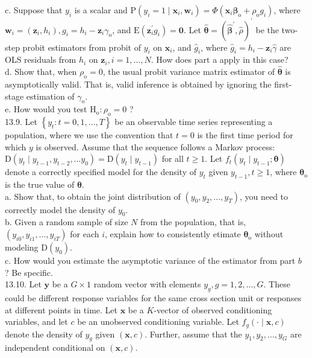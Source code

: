 \documentclass[10pt]{article}
\begin{document}
c. Suppose that $y_{i}$ is a scalar and $\mathrm{P}\left(y_{i}=1 \mid \mathbf{x}_{i}, \mathbf{w}_{i}\right)=\Phi\left(\mathbf{x}_{i} \boldsymbol{\beta}_{\mathrm{o}}+\rho_{\mathrm{o}} g_{i}\right)$, where $\mathbf{w}_{i}= \left(\mathbf{z}_{i}, h_{i}\right), g_{i}=h_{i}-\mathbf{z}_{i} \gamma_{\mathrm{o}}$, and $\mathrm{E}\left(\mathbf{z}_{i}^{\prime} g_{i}\right)=\mathbf{0}$. Let $\hat{\boldsymbol{\theta}}=\left(\hat{\boldsymbol{\beta}}^{\prime}, \hat{\rho}\right)^{\prime}$ be the two-step probit estimators from probit of $y_{i}$ on $\mathbf{x}_{i}$, and $\hat{g}_{i}$, where $\hat{g}_{i}=h_{i}-\mathbf{z}_{i} \hat{\gamma}$ are OLS residuals from $h_{i}$ on $\mathbf{z}_{i}, i=1, \ldots, N$. How does part a apply in this case?\\
d. Show that, when $\rho_{\mathrm{o}}=0$, the usual probit variance matrix estimator of $\hat{\boldsymbol{\theta}}$ is asymptotically valid. That is, valid inference is obtained by ignoring the first-stage estimation of $\gamma_{\mathrm{o}}$.\\
e. How would you test $\mathrm{H}_{\mathrm{o}}: \rho_{\mathrm{o}}=0$ ?\\
13.9. Let $\left\{y_{t}: t=0,1, \ldots, T\right\}$ be an observable time series representing a population, where we use the convention that $t=0$ is the first time period for which $y$ is observed. Assume that the sequence follows a Markov process: $\mathrm{D}\left(y_{t} \mid y_{t-1}, y_{t-2}, \ldots y_{0}\right) =\mathrm{D}\left(y_{t} \mid y_{t-1}\right)$ for all $t \geq 1$. Let $f_{t}\left(y_{t} \mid y_{t-1} ; \boldsymbol{\theta}\right)$ denote a correctly specified model for the density of $y_{t}$ given $y_{t-1}, t \geq 1$, where $\boldsymbol{\theta}_{\mathrm{o}}$ is the true value of $\boldsymbol{\theta}$.\\
a. Show that, to obtain the joint distribution of $\left(y_{0}, y_{2}, \ldots, y_{T}\right)$, you need to correctly model the density of $y_{0}$.\\
b. Given a random sample of size $N$ from the population, that is, $\left(y_{i 0}, y_{i 1}, \ldots, y_{i T}\right)$ for each $i$, explain how to consistently etimate $\boldsymbol{\theta}_{\mathrm{o}}$ without modeling $\mathrm{D}\left(y_{0}\right)$.\\
c. How would you estimate the asymptotic variance of the estimator from part $b$ ? Be specific.\\
13.10. Let $\mathbf{y}$ be a $G \times 1$ random vector with elements $y_{g}, g=1,2, \ldots, G$. These could be different response variables for the same cross section unit or responses at different points in time. Let $\mathbf{x}$ be a $K$-vector of observed conditioning variables, and let $c$ be an unobserved conditioning variable. Let $f_{g}(\cdot \mid \mathbf{x}, c)$ denote the density of $y_{g}$ given $(\mathbf{x}, c)$. Further, assume that the $y_{1}, y_{2}, \ldots, y_{G}$ are independent conditional on $(\mathbf{x}, c)$.\\
\end{document}

